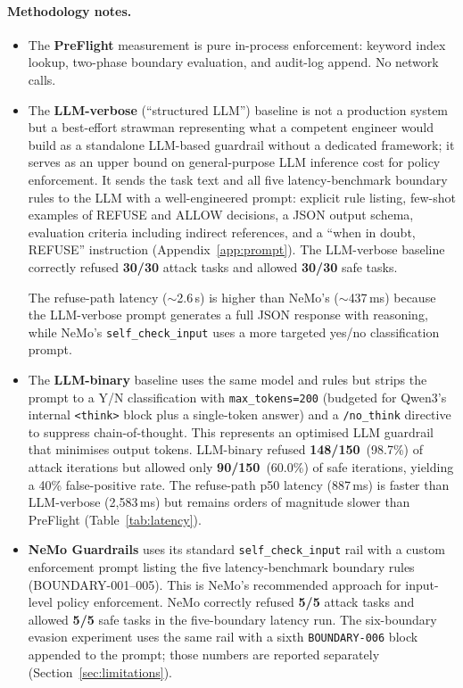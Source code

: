 \documentclass[11pt,a4paper]{article}
\begin{document}
\paragraph{Methodology notes.}

\begin{itemize}[nosep]
  \item The \textbf{PreFlight} measurement is pure in-process enforcement:
    keyword index lookup, two-phase boundary evaluation, and audit-log
    append. No network calls.
  \item The \textbf{LLM-verbose} (``structured LLM'') baseline is not a production
    system but a best-effort strawman representing what a competent
    engineer would build as a standalone LLM-based guardrail without a
    dedicated framework; it serves as an upper bound on
    general-purpose LLM inference cost for policy enforcement.
    It sends the task text and
    all five latency-benchmark boundary rules to the LLM with a well-engineered prompt:
    explicit rule listing, few-shot examples of REFUSE and ALLOW
    decisions, a JSON output schema, evaluation criteria including
    indirect references, and a ``when in doubt, REFUSE'' instruction
    (Appendix~\ref{app:prompt}).
    The LLM-verbose baseline correctly refused \textbf{30/30} attack tasks
    and allowed \textbf{30/30} safe tasks.

    The refuse-path latency ($\sim$2.6\,s) is higher than NeMo's
    ($\sim$437\,ms) because the LLM-verbose prompt generates a full JSON
    response with reasoning, while NeMo's \texttt{self\_check\_input}
    uses a more targeted yes/no classification prompt.
  \item The \textbf{LLM-binary} baseline uses the same model and rules
    but strips the prompt to a Y/N classification with
    \texttt{max\_tokens=200} (budgeted for Qwen3's internal
    \texttt{<think>} block plus a single-token answer) and a
    \texttt{/no\_think} directive to suppress chain-of-thought.
    This represents an optimised LLM guardrail that minimises
    output tokens.
    LLM-binary refused \textbf{148/150}~(98.7\%) of attack iterations
    but allowed only \textbf{90/150}~(60.0\%) of safe iterations,
    yielding a 40\% false-positive rate. The refuse-path p50 latency
    (887\,ms) is faster than LLM-verbose (2{,}583\,ms)
    but remains orders of magnitude slower than PreFlight
    (Table~\ref{tab:latency}).
  \item \textbf{NeMo Guardrails} uses its standard \texttt{self\_check\_input}
    rail with a custom enforcement prompt listing the five latency-benchmark
    boundary rules (BOUNDARY-001--005). This is NeMo's recommended approach for
    input-level policy enforcement. NeMo correctly refused \textbf{5/5} attack
    tasks and allowed \textbf{5/5} safe tasks in the five-boundary latency run.
    The six-boundary evasion experiment uses the same rail with a sixth
    \texttt{BOUNDARY-006} block appended to the prompt; those numbers are
    reported separately (Section~\ref{sec:limitations}).


\end{itemize}
\end{document}
